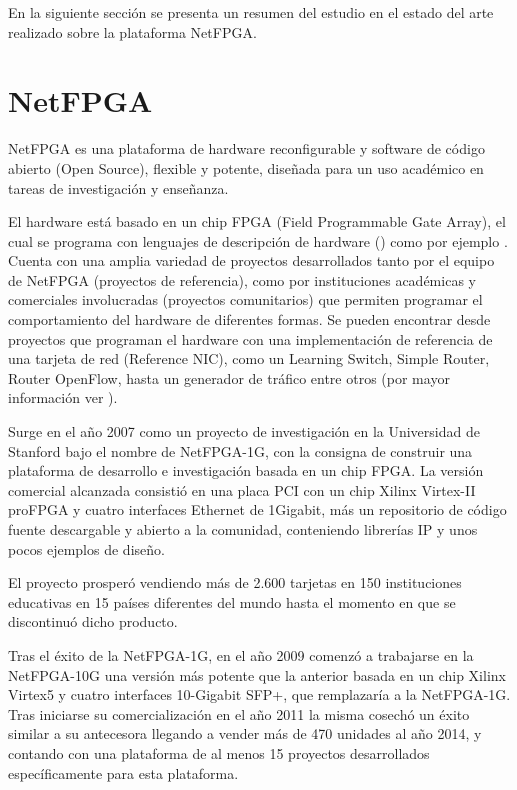 En la siguiente secci\'on se presenta un resumen del estudio en el estado del arte realizado sobre la plataforma NetFPGA.

\section{NetFPGA}
\label{section2.9}

NetFPGA \cite{NetFPGA1} es una plataforma de hardware reconfigurable y software de c\'odigo abierto  
 (Open Source), flexible y potente, diseñada para un uso académico en tareas de investigación y enseñanza.

El hardware est\'a basado en un chip FPGA (Field Programmable Gate Array), el cual se programa con lenguajes de descripci\'on de hardware () como por ejemplo . Cuenta con una amplia variedad de proyectos desarrollados tanto por el equipo de NetFPGA (proyectos de referencia), como por instituciones académicas y comerciales involucradas (proyectos comunitarios) que permiten programar el comportamiento del hardware  de diferentes formas. Se pueden encontrar desde proyectos que programan el hardware con una implementación de referencia de una tarjeta de red (Reference NIC), como un Learning Switch, Simple Router, Router OpenFlow, hasta un generador de tr\'afico entre otros  
 (por mayor informaci\'on ver \citep{NetFPGA2}).

Surge en el año 2007 como un proyecto de investigación en la Universidad de Stanford bajo el nombre de NetFPGA-1G, con la consigna de construir una plataforma de desarrollo e investigación basada en un chip FPGA. La versi\'on comercial alcanzada consisti\'o en una placa PCI con un chip Xilinx Virtex-II proFPGA y cuatro interfaces Ethernet de 1Gigabit, m\'as un repositorio de código fuente descargable y abierto a la comunidad, conteniendo librerías IP y unos pocos ejemplos de diseño.

El proyecto prosper\'o vendiendo m\'as de 2.600 tarjetas en 150 instituciones educativas en 15 países diferentes del mundo hasta el momento en que se discontinu\'o dicho producto.

Tras el éxito de la NetFPGA-1G, en el año 2009 comenzó a trabajarse en la NetFPGA-10G una versi\'on m\'as potente que la  anterior basada en un chip Xilinx Virtex5 y cuatro interfaces 10-Gigabit SFP+, que remplazaría a la NetFPGA-1G. Tras iniciarse su comercialización en el año 2011 la misma cosech\'o un éxito similar a su antecesora llegando a vender m\'as de 470 unidades al año 2014, y contando con una plataforma de al menos 15 proyectos desarrollados específicamente para esta plataforma.

